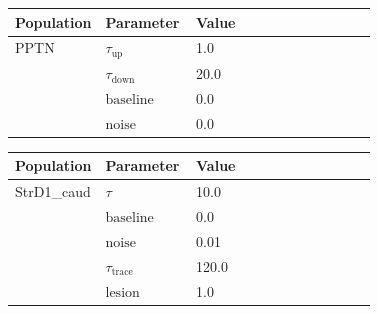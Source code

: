 \documentclass{article}
\begin{document}
\vspace{2ex}

\noindent
\begin{tabularx}{\linewidth}{|p{0.25\linewidth}|p{0.25\linewidth}|X|}\hline
\textbf{Population} & \textbf{Parameter} & \textbf{Value}   \\ \hline

    PPTN             & $\tau_{\text{up}}$        & 1.0  \\ \hline

                 & $\tau_{\text{down}}$        & 20.0  \\ \hline

                 & ${\text{baseline}}$        & 0.0  \\ \hline

                 & ${\text{noise}}$        & 0.0  \\ \hline

\end{tabularx}

\vspace{2ex}

\noindent
\begin{tabularx}{\linewidth}{|p{0.25\linewidth}|p{0.25\linewidth}|X|}\hline
\textbf{Population} & \textbf{Parameter} & \textbf{Value}   \\ \hline

    StrD1\_caud             & $\tau$        & 10.0  \\ \hline

                 & ${\text{baseline}}$        & 0.0  \\ \hline

                 & ${\text{noise}}$        & 0.01  \\ \hline

                 & $\tau_{\text{trace}}$        & 120.0  \\ \hline

                 & ${\text{lesion}}$        & 1.0  \\ \hline

\end{tabularx}

\vspace{2ex}
\end{document}
